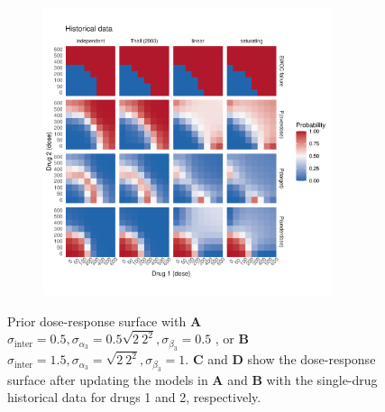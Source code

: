 \documentclass[AMA,STIX1COL]{WileyNJD-v2}
\begin{document}
\begin{figure}[p]
{\begin{subfigure}[t]{.45\linewidth}
\end{subfigure}
\hspace{1mm}
\begin{subfigure}[t]{.45\linewidth}
\caption{}
{\includegraphics[width=240pt]{figures/ggplot_mu_sd_inter_1_5_Historical_data.pdf}}
\end{subfigure}
}
\caption{Prior dose-response surface with \textbf{A} $\sigma_\text{inter} = 0.5,\sigma_{\alpha_3} = 0.5 \sqrt{2~2^2}, \sigma_{\beta_3} = 0.5$
, or \textbf{B} $\sigma_\text{inter} = 1.5, \sigma_{\alpha_3} = \sqrt{2~2^2}, \sigma_{\beta_3} = 1$. \textbf{C} and \textbf{D} show the dose-response surface after updating the models in \textbf{A} and \textbf{B} with the single-drug historical data for drugs 1 and 2, respectively.}
\label{fig:prior_histdata}
\end{figure}
\end{document}
